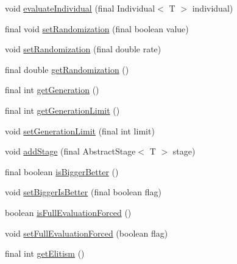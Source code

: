 \begin{DoxyCompactItemize}
\item 
void \hyperlink{classjenes_1_1_genetic_algorithm_3_01_t_01extends_01_chromosome_01_4_a17d1c99e638312a18394c6d76dedb2f3}{evaluate\-Individual} (final Individual$<$ T $>$ individual)
\item 
final void \hyperlink{classjenes_1_1_genetic_algorithm_3_01_t_01extends_01_chromosome_01_4_acf14a43bc2c8bed69aa0334b18d58ba7}{set\-Randomization} (final boolean value)
\item 
void \hyperlink{classjenes_1_1_genetic_algorithm_3_01_t_01extends_01_chromosome_01_4_a78cb20ba6256d06e7cd04696e697cc4e}{set\-Randomization} (final double rate)
\item 
final double \hyperlink{classjenes_1_1_genetic_algorithm_3_01_t_01extends_01_chromosome_01_4_add75e6182615af89791921472d2fbc9f}{get\-Randomization} ()
\item 
final int \hyperlink{classjenes_1_1_genetic_algorithm_3_01_t_01extends_01_chromosome_01_4_a25602ec654959a43a64f12e92251cb47}{get\-Generation} ()
\item 
final int \hyperlink{classjenes_1_1_genetic_algorithm_3_01_t_01extends_01_chromosome_01_4_ac6eceff2ad4a055f3c6047fb4c272ef3}{get\-Generation\-Limit} ()
\item 
void \hyperlink{classjenes_1_1_genetic_algorithm_3_01_t_01extends_01_chromosome_01_4_a1e4d04de7cf34838296ad6745ac046f5}{set\-Generation\-Limit} (final int limit)
\item 
void \hyperlink{classjenes_1_1_genetic_algorithm_3_01_t_01extends_01_chromosome_01_4_aa0ab85fdb0cb1880a469044affbb32e7}{add\-Stage} (final Abstract\-Stage$<$ T $>$ stage)
\item 
final boolean \hyperlink{classjenes_1_1_genetic_algorithm_3_01_t_01extends_01_chromosome_01_4_a34e6ea627850ec240d4c0bba39170d4b}{is\-Bigger\-Better} ()
\item 
void \hyperlink{classjenes_1_1_genetic_algorithm_3_01_t_01extends_01_chromosome_01_4_afcc4f944d2d47d757e177a22a660bfd3}{set\-Bigger\-Is\-Better} (final boolean flag)
\item 
boolean \hyperlink{classjenes_1_1_genetic_algorithm_3_01_t_01extends_01_chromosome_01_4_a7305deb720716287d256832f0bd44785}{is\-Full\-Evaluation\-Forced} ()
\item 
void \hyperlink{classjenes_1_1_genetic_algorithm_3_01_t_01extends_01_chromosome_01_4_a9fe6f2d66ffcbce1233194871cdfc5ae}{set\-Full\-Evaluation\-Forced} (boolean flag)
\item 
final int \hyperlink{classjenes_1_1_genetic_algorithm_3_01_t_01extends_01_chromosome_01_4_a8bbf6df4fc231cfc88a7e879d2bbf814}{get\-Elitism} ()

\end{DoxyCompactItemize}

